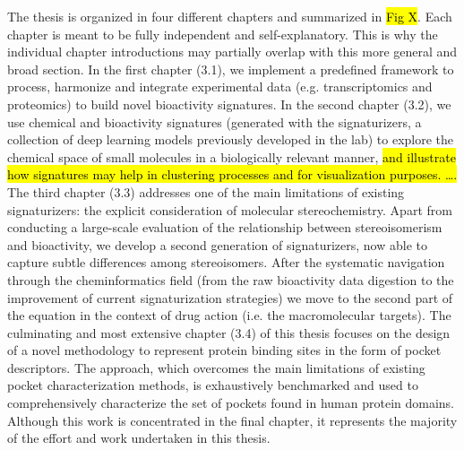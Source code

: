 The thesis is organized in four different chapters and summarized in \hl{Fig X}. Each chapter is meant to be fully independent and self-explanatory. This is why the individual chapter introductions may partially overlap with this more general and broad section. In the first chapter (3.1), we implement a predefined framework to process, harmonize and integrate experimental data (e.g. transcriptomics and proteomics) to build novel bioactivity signatures. In the second chapter (3.2), we use chemical and bioactivity signatures (generated with the signaturizers, a collection of deep learning models previously developed in the lab) to explore the chemical space of small molecules in a biologically relevant manner, \hl{and illustrate how signatures may help in clustering processes and for visualization purposes. ….}  The third chapter (3.3) addresses one of the main limitations of existing signaturizers: the explicit consideration of molecular stereochemistry. Apart from conducting a large-scale evaluation of the relationship between stereoisomerism and bioactivity, we develop a second generation of signaturizers, now able to capture subtle differences among stereoisomers. After the systematic navigation through the cheminformatics field (from the raw bioactivity data digestion to the improvement of current signaturization strategies) we move to the second part of the equation in the context of drug action (i.e. the macromolecular targets). The culminating and most extensive chapter (3.4) of this thesis focuses on the design of a novel methodology to represent protein binding sites in the form of pocket descriptors. The approach, which overcomes the main limitations of existing pocket characterization methods, is exhaustively benchmarked and used to comprehensively characterize the set of pockets found in human protein domains. Although this work is concentrated in the final chapter, it represents the majority of the effort and work undertaken in this thesis.






\renewcommand{\thesubsection}{\thechapter.\arabic{section}.\arabic{subsection}}
